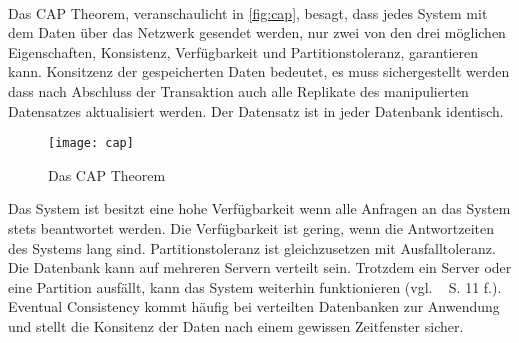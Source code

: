 \\
Das \gls{CAP} Theorem, veranschaulicht in \autoref{fig:cap}, besagt, dass jedes System mit dem Daten über das Netzwerk gesendet werden, nur zwei von den drei möglichen Eigenschaften, Konsistenz, Verfügbarkeit und Partitionstoleranz, garantieren kann.
Konsitzenz der gespeicherten Daten bedeutet, es muss sichergestellt werden dass nach Abschluss der Transaktion auch alle Replikate des manipulierten Datensatzes aktualisiert werden. Der Datensatz ist in jeder Datenbank identisch.
%
\begin{figure}[H]
  \centering
  \texttt{[image: cap]}
  \grayRule
  \caption{Das CAP Theorem}
  \label{fig:cap}
\end{figure}
%
Das System ist besitzt eine hohe Verfügbarkeit wenn alle Anfragen an das System stets beantwortet werden. Die Verfügbarkeit ist gering, wenn die Antwortzeiten des Systems lang sind.
Partitionstoleranz ist gleichzusetzen mit Ausfalltoleranz. Die Datenbank kann auf mehreren Servern verteilt sein. Trotzdem ein Server oder eine Partition ausfällt, kann das System weiterhin funktionieren (vgl. ~\cite{couchDB} S. 11 f.).\\
Eventual Consistency kommt häufig bei verteilten Datenbanken zur Anwendung und stellt die Konsitenz der Daten nach einem gewissen Zeitfenster sicher.